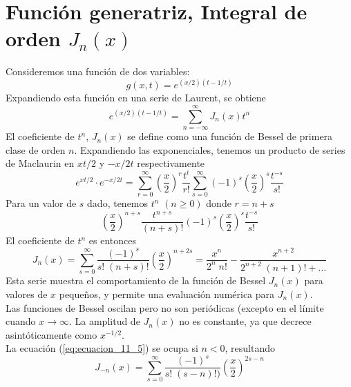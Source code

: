 \section{Función generatriz, Integral de orden $J_{n}(x)$}
Consideremos una función de dos variables:
\begin{equation}
g(x,t) = e^{(x/2)(t-1/t)}
\label{eq:ecuacion_11_1}
\end{equation}
Expandiendo esta función en una serie de Laurent, se obtiene
\begin{equation}
e^{(x/2)(t-1/t)} = \sum_{n=-\infty}^{\infty} J_{n} (x) t^{n}
\label{eq:ecuacion_11_2}
\end{equation}
El coeficiente de $t^{n}$, $J_{n}(x)$ se define como una función de Bessel de primera clase de orden $n$. Expandiendo las exponenciales, tenemos un producto de series de Maclaurin en $xt/2$ y $-x/2t$ respectivamente
\begin{equation}
e^{xt/2} \cdot e^{-x/2t} = \sum_{r=0}^{\infty} \left( \dfrac{x}{2} \right)^{r} \dfrac{t^{t}}{r!} \sum_{s=0}^{\infty} (-1)^{s} \left( \dfrac{x}{2} \right)^{s} \dfrac{t^{-s}}{s!}
\label{eq:ecuacion_11_3}
\end{equation}
Para un valor de $s$ dado, tenemos $t^{n}$ $(n \geq 0 )$ donde $r=n+s$
\begin{equation}
\left( \dfrac{x}{2} \right)^{n+s} \dfrac{t^{n+s}}{(n+s)!} (-1)^{s} \left( \dfrac{x}{2} \right)^{s} \dfrac{t^{-s}}{s!}
\label{eq:ecuacion_11_4}
\end{equation}
El coeficiente de $t^{n}$ es entonces
\begin{equation}
J_{n}(x) = \sum_{s=0}^{\infty} \dfrac{(-1)^{s}}{s! \; (n+s)!} \left( \dfrac{x}{2} \right)^{n+2s} = \dfrac{x^{n}}{2^{n} \; n!} - \dfrac{x^{n+2}}{2^{n+2} \; (n+1)! + \ldots}
\label{eq:ecuacion_11_5}
\end{equation}
Esta serie muestra el comportamiento de la función de Bessel $J_{n}(x)$ para valores de $x$ pequeños, y permite una evaluación numérica para $J_{n}(x)$.
\\
Las funciones de Bessel oscilan pero no son periódicas (excepto en el límite cuando $x \to \infty$. La amplitud de $J_{n}(x)$ no es constante, ya que decrece asintóticamente como $x^{-1/2}$.
\\
La ecuación (\ref{eq:ecuacion_11_5}) se ocupa si $n<0$, resultando
\begin{equation}
J_{-n} (x) = \sum_{s=0}^{\infty} \dfrac{(-1)^{s}}{s! \; (s-n)!)} \left( \dfrac{x}{2} \right)^{2s-n}
\label{eq:ecuacion_11_6}
\end{equation}
